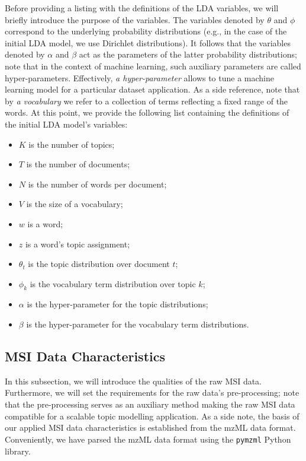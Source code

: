 \documentclass{mpaper}
\begin{document}
\par Before providing a listing with the definitions of the LDA variables, we will briefly introduce the purpose of the variables. The variables denoted by $\theta$ and $\phi$ correspond to the underlying probability distributions (e.g., in the case of the initial LDA model, we use Dirichlet distributions). It follows that the variables denoted by $\alpha$ and $\beta$ act as the parameters of the latter probability distributions; note that in the context of machine learning, such auxiliary parameters are called hyper-parameters. Effectively, \textit{a hyper-parameter} allows to tune a machine learning model for a particular dataset application. As a side reference, note that by \textit{a vocabulary} we refer to a collection of terms reflecting a fixed range of the words. At this point, we provide the following list containing the definitions of the initial LDA model's variables: 
\begin{itemize}
	\item $K$ is the number of topics;
	\item $T$ is the number of documents;
	\item $N$ is the number of words per document;
	\item $V$ is the size of a vocabulary;
	\item $w$ is a word;
	\item $z$ is a word's topic assignment;
	\item $\theta_t$ is the topic distribution over document $t$;
	\item $\phi_k$ is the vocabulary term distribution over topic $k$;
	\item $\alpha$ is the hyper-parameter for the topic distributions;
	\item $\beta$ is the hyper-parameter for the vocabulary term distributions.
\end{itemize}

\subsection{MSI Data Characteristics}

\par In this subsection, we will introduce the qualities of the raw MSI data. Furthermore, we will set the requirements for the raw data's pre-processing; note that the pre-processing serves as an auxiliary method making the raw MSI data compatible for a scalable topic modelling application. As a side note, the basis of our applied MSI data characteristics is established from the mzML data format. Conveniently, we have parsed the mzML data format using the \texttt{pymzml} Python library. 
\end{document}
